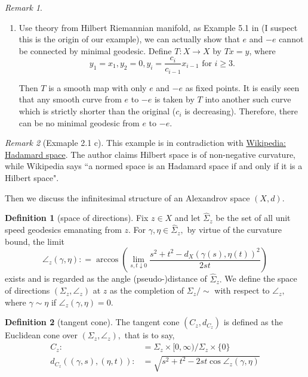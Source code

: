 \documentclass{report}
\theoremstyle{remark}
\newtheorem{rmk}{Remark}
\theoremstyle{definition}
\newtheorem{defn}{Definition}
\begin{document}
\begin{rmk}
\begin{enumerate}
				\item Use theory from Hilbert Riemannian manifold, as Example 5.1 in \cite{grossman1965hilbert} (I suspect this is the origin of our example), we can actually show that $e$ and $-e$ cannot be connected by minimal geodesic.
		      Define \( T: X \rightarrow X \) by \( T x = y \), where
		      \[
			      y _ { 1 } = x _ { 1 } , y _ { 2 } = 0 , y _ { i } = \frac{c_i}{c_{i-1}} x_{i-1} \text { for } i \geq 3 . \]

						Then \( T \) is a smooth map with only \( e \) and \(- e \) as fixed points. It is easily seen that any smooth curve from \( e\) to \( -e \) is taken by \( T \) into another such curve which is strictly shorter than the original ($c_i$ is decreasing). Therefore, there can be no minimal geodesic from \( e \) to \( -e . \)


	\end{enumerate}
\end{rmk}

\begin{rmk}[Exmaple 2.1 c]
	This example is in contradiction with \href{https://en.wikipedia.org/wiki/Hadamard_space}{Wikipedia: Hadamard space}. The author claims Hilbert space is of non-negative curvature, while Wikipedia says ``a normed space is an Hadamard space if and only if it is a Hilbert space".
\end{rmk}

Then we discuss the infinitesimal structure of an Alexandrov space \( ( X , d ) . \)

\begin{defn}[space of directions]
	Fix \( z \in X \) and let \( \hat { \Sigma } _ { z } \) be the set of all unit speed geodesics emanating from \( z \). For \( \gamma , \eta \in \hat { \Sigma } _ { z } , \) by virtue of the curvature bound, the limit
	\[ \angle _ { z } ( \gamma , \eta ): = \arccos \left( \lim _ { s , t \downarrow 0 } \frac { s ^ { 2 } + t ^ { 2 } - d _ { X }\left( \gamma ( s ) , \eta ( t ) \right) ^ { 2 } } { 2 s t } \right) \]
	exists and is regarded as the angle (pseudo-)distance of \( \hat { \Sigma } _ { z } . \) We define the space of directions \( \left( \Sigma _ { z } , \angle _ { z } \right) \) at \( z \) as the completion of \( \Sigma _ { z } / \sim \) with respect to \( \angle _ { z } , \) where \( \gamma \sim \eta \) if \( \angle _ { z } ( \gamma , \eta ) = 0 . \)
\end{defn}

\begin{defn}[tangent cone]
	The tangent cone \( \left( C _ { z } , d _ { C _ { z } } \right) \) is defined as the Euclidean cone over \( \left( \Sigma _ { z } , \angle _ { z } \right) , \)
	that is to say,
	\begin{align*}
		C _ { z }:                                           & = \Sigma _ { z } \times [ 0 , \infty ) / \Sigma _ { z } \times \{ 0 \}          \\
		d _ { C _ { z } } ( ( \gamma , s ) , ( \eta , t ) ): & = \sqrt { s ^ { 2 } + t ^ { 2 } - 2 s t \cos \angle _ { z } ( \gamma , \eta ) }
	\end{align*}
\end{defn}
\end{document}

